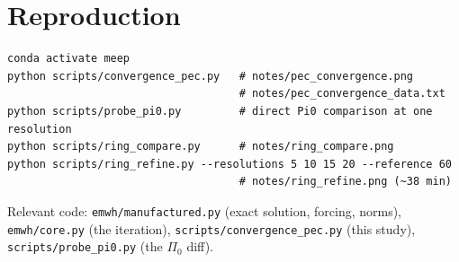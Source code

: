 \documentclass[11pt]{article}
\begin{document}
\section{Reproduction}

\begin{verbatim}
conda activate meep
python scripts/convergence_pec.py   # notes/pec_convergence.png
                                    # notes/pec_convergence_data.txt
python scripts/probe_pi0.py         # direct Pi0 comparison at one resolution
python scripts/ring_compare.py      # notes/ring_compare.png
python scripts/ring_refine.py --resolutions 5 10 15 20 --reference 60
                                    # notes/ring_refine.png (~38 min)
\end{verbatim}

Relevant code: \texttt{emwh/manufactured.py} (exact solution, forcing, norms),
\texttt{emwh/core.py} (the iteration), \texttt{scripts/convergence\_pec.py}
(this study), \texttt{scripts/probe\_pi0.py} (the $\Pi_0$ diff).
\end{document}
